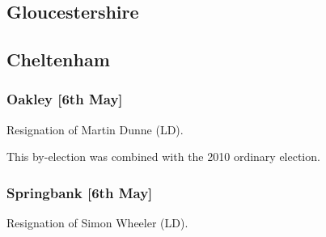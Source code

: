 \begin{resultsiii}
\section{Gloucestershire}

%
%
%
%

\subsection{Cheltenham}

\subsubsection*{Oakley \hspace*{\fill}\nolinebreak[1]%
\enspace\hspace*{\fill}
[6th May]}


Resignation of Martin Dunne (LD).

This by-election was combined with the 2010 ordinary election.

\subsubsection*{Springbank \hspace*{\fill}\nolinebreak[1]%
\enspace\hspace*{\fill}
[6th May]}


Resignation of Simon Wheeler (LD).


\end{resultsiii}
